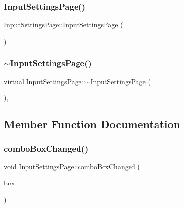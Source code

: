 \subsubsection{\texorpdfstring{Input\+Settings\+Page()}{InputSettingsPage()}}
{\footnotesize\ttfamily Input\+Settings\+Page\+::\+Input\+Settings\+Page (\begin{DoxyParamCaption}{ }\end{DoxyParamCaption})}

\mbox{\label{classInputSettingsPage_a39fea05180c5232302d17fdd756fada4}} 
\subsubsection{\texorpdfstring{$\sim$\+Input\+Settings\+Page()}{~InputSettingsPage()}}
{\footnotesize\ttfamily virtual Input\+Settings\+Page\+::$\sim$\+Input\+Settings\+Page (\begin{DoxyParamCaption}{ }\end{DoxyParamCaption})\hspace{0.3cm}{\ttfamily [inline]}, {\ttfamily [virtual]}}



\subsection{Member Function Documentation}
\mbox{\label{classInputSettingsPage_a38660bfa140d4e6376fd2f9c35606115}} 
\subsubsection{\texorpdfstring{combo\+Box\+Changed()}{comboBoxChanged()}}
{\footnotesize\ttfamily void Input\+Settings\+Page\+::combo\+Box\+Changed (\begin{DoxyParamCaption}\item[{Combo\+Box $\ast$}]{box }\end{DoxyParamCaption})\hspace{0.3cm}{\ttfamily [override]}}

